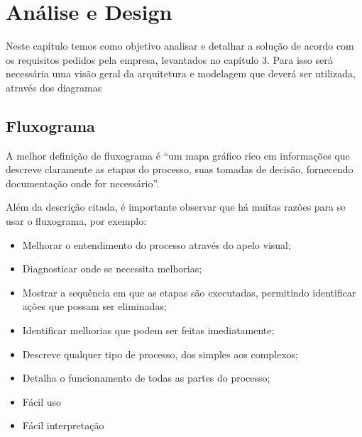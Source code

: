 \chapter{Análise e Design}

Neste capítulo temos como objetivo analisar e detalhar a solução de acordo com os requisitos pedidos pela empresa, levantados no capítulo 3. Para isso será necessária uma visão geral da arquitetura e modelagem que deverá ser utilizada, através dos diagramas
\newpage
\section{Fluxograma}

A melhor definição de fluxograma é “um mapa gráfico rico em informações que descreve claramente as etapas do processo, suas tomadas de decisão, fornecendo documentação onde for necessário”.\cite{Gradus2019} 

Além da descrição citada, é importante observar que há muitas razões para se usar o fluxograma, por exemplo:
\begin{itemize}
	\item Melhorar o entendimento do processo através do apelo visual;
	\item Diagnosticar onde se necessita melhorias;
	\item Mostrar a sequência em que as etapas são executadas, permitindo identificar ações que possam ser eliminadas;
	\item Identificar melhorias que podem ser feitas imediatamente;
	\item Descreve qualquer tipo de processo, dos simples aos complexos;
	\item Detalha o funcionamento de todas as partes do processo;
	\item Fácil uso
	\item Fácil interpretação
\end{itemize}
\newpage


